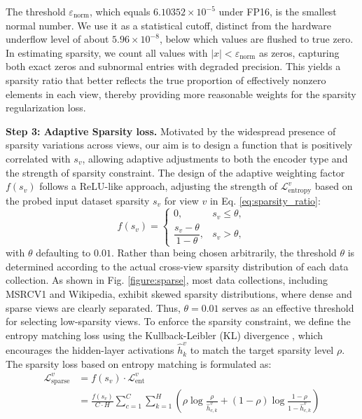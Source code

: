 \documentclass[10pt, journal, compsoc]{IEEEtran}
\newif\ifshowrevision
\newenvironment{revpar}{%
  \ifshowrevision
    \color{blue}%
  \fi
}{}
\begin{document}
\begin{revpar} The threshold $\varepsilon_{\mathrm{norm}}$, which equals $6.10352\times10^{-5}$ under FP16, is the smallest normal number. We use it as a statistical cutoff, distinct from the hardware underflow level of about $5.96\times10^{-8}$, below which values are flushed to true zero. In estimating sparsity, we count all values with $|x| < \varepsilon_{\mathrm{norm}}$ as zeros, capturing both exact zeros and subnormal entries with degraded precision. This yields a sparsity ratio that better reflects the true proportion of effectively nonzero elements in each view, thereby providing more reasonable weights for the sparsity regularization loss. \end{revpar}

\textbf{Step 3: Adaptive Sparsity loss.} Motivated by the widespread presence of sparsity variations across views, our aim is to design a function that is positively correlated with $s_{v}$, allowing adaptive adjustments to both the encoder type and the strength of sparsity constraint. The design of the adaptive weighting factor $f(s_{v})$ follows a ReLU-like approach, adjusting the strength of $\mathcal{L}_{\text{entropy}}^{v}$ based on the probed input dataset sparsity $s_{v}$ for view $v$ in Eq. \eqref{eq:sparsity_ratio}:
\begin{equation}
f(s_v)=
\begin{cases}
0, & s_v \leq \theta, \\[2pt]
\dfrac{s_v-\theta}{1-\theta}, & s_v > \theta,
\end{cases}
\label{eq:adaptive_factor_cn}
\end{equation}
with $\theta$ defaulting to $0.01$. Rather than being chosen arbitrarily, the threshold $\theta$ is determined according to the actual cross-view sparsity distribution of each data collection. As shown in Fig. \ref{figure:sparse}, most data collections, including MSRCV1 and Wikipedia, exhibit skewed sparsity distributions, where dense and sparse views are clearly separated. Thus, $\theta = 0.01$ serves as an effective threshold for selecting low-sparsity views. To enforce the sparsity constraint, we define the entropy matching loss using the Kullback-Leibler (KL) divergence \citep{kullback1951information}, which encourages the hidden-layer activations $\hat{h}^{v}_{k}$ to match the target sparsity level $\rho$.
The sparsity loss based on entropy matching is formulated as:
\begin{equation}
  \begin{aligned}
  \mathcal{L}_{\text{sparse}}^{v} & = f(s_{v}) \cdot \mathcal{L}_{\text{ent}}^{v}                                                                                                                                                            \\
  & = \!\frac{f(s_v)}{\!C \!\cdot \!H}\!\sum_{c=1}^{C}\!\sum_{k=1}^{H}\!\left( \!\rho \log \frac{\rho}{\hat{h}^v_{c,k}}\!+ \!(1 \!\!- \!\!\rho) \!\log \!\frac{\!1 \!- \!\rho}{\!1 \!- \!\hat{h}^v_{c,k}}\right)
  \end{aligned}
  \label{eq:entropy}
\end{equation}
\end{document}

